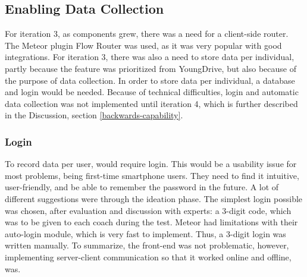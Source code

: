 \subsection{Enabling Data Collection}

For iteration 3, as components grew, there was a need for a client-side router. The Meteor plugin Flow Router was used, as it was very popular with good integrations. For iteration 3, there was also a need to store data per individual, partly because the feature was prioritized from YoungDrive, but also because of the purpose of data collection. In order to store data per individual, a database and login would be needed. Because of technical difficulties, login and automatic data collection was not implemented until iteration 4, which is further described in the Discussion, section \ref{backwards-capability}.

\subsubsection{Login}
To record data per user, would require login. This would be a usability issue for most problems, being first-time smartphone users. They need to find it intuitive, user-friendly, and be able to remember the password in the future. A lot of different suggestions were through the ideation phase. The simplest login possible was chosen, after evaluation and discussion with experts: a 3-digit code, which was to be given to each coach during the test. Meteor had limitations with their auto-login module, which is very fast to implement. Thus, a 3-digit login was written manually. To summarize, the front-end was not problematic, however, implementing server-client communication so that it worked online and offline, was.




